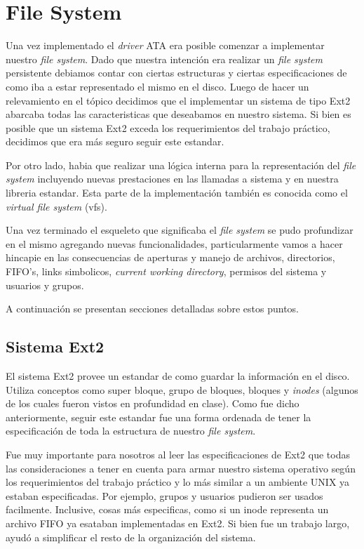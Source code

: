 \documentclass[a4paper,10pt]{article}
\begin{document}
\section{File System}
    
    Una vez implementado el \textit{driver} ATA era posible comenzar a implementar nuestro \textit{file system}.
    Dado que nuestra intención era realizar un \textit{file system} persistente debiamos contar con ciertas estructuras
    y ciertas especificaciones de como iba a estar representado el mismo en el disco. Luego de hacer un relevamiento
    en el tópico decidimos que el implementar un sistema de tipo Ext2 abarcaba todas las caracteristicas que deseabamos
    en nuestro sistema. Si bien es posible que un sistema Ext2 exceda los requerimientos del trabajo práctico, decidimos
    que era más seguro seguir este estandar.
    
    Por otro lado, habia que realizar una lógica interna para la representación del \textit{file system}
    incluyendo nuevas prestaciones en las llamadas a sistema y en nuestra libreria estandar. Esta parte de la 
    implementación también es conocida como el \textit{virtual file system} (vfs).

    Una vez terminado el esqueleto que significaba el \textit{file system} se pudo profundizar en el mismo agregando
    nuevas funcionalidades, particularmente vamos a hacer hincapie en las consecuencias de aperturas y manejo de
    archivos, directorios, FIFO's, links simbolicos, \textit{current working
    directory}, permisos del sistema y usuarios y grupos.

    A continuación se presentan secciones detalladas sobre estos puntos.

    \subsection{Sistema Ext2}
    El sistema Ext2 provee un estandar de como guardar la información en el disco. Utiliza conceptos como super bloque, 
    grupo de bloques, bloques y \textit{inodes} (algunos de los cuales fueron vistos en profundidad en clase). Como fue
    dicho anteriormente, seguir este estandar fue una forma ordenada de tener la especificación de toda la estructura
    de nuestro \textit{file system}.

    Fue muy importante para nosotros al leer las especificaciones de Ext2 que todas las consideraciones a tener en cuenta
    para armar nuestro sistema operativo según los requerimientos del trabajo práctico y lo más similar a un ambiente
    UNIX ya estaban especificadas. Por ejemplo, grupos y usuarios pudieron ser usados facilmente. Inclusive, cosas más
    especificas, como si un inode representa un archivo FIFO ya esataban implementadas en Ext2. Si bien fue un trabajo
    largo, ayudó a simplificar el resto de la organización del sistema.
\end{document}
